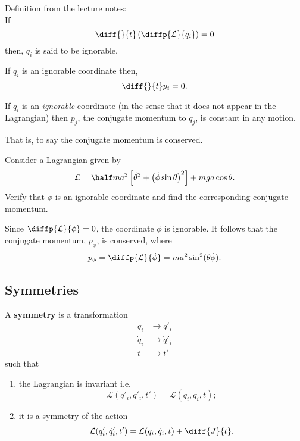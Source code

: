 \documentclass[12pt, a4paper]{article}
\newcommand{\LL}{\mathcal L}
\begin{document}
\begin{mdremark}
    Definition from the lecture notes: \\
    If 
    \[\diff{}{t} \left( \diffp{\LL}{{\dot{q}_i}} \right) =0\]
    then, \(q_i\) is said to be ignorable.
\end{mdremark}

\begin{theorem}
    If \(q_i\) is an ignorable coordinate then,
    \[\diff{}{t} p_i =0.\]
\end{theorem}

\begin{mdcor}
    If \(q_i\) is an \textit{ignorable} coordinate (in the sense that it does not appear in the Lagrangian) then \(p_j\), the conjugate momentum to \(q_j\), is constant in any motion.
\end{mdcor}

\begin{mdremark}
    That is, to say the conjugate momentum is conserved.
\end{mdremark}

\begin{mdexample}
    Consider a Lagrangian given by 
    \[\mathcal{L}=\half ma^2 \left[ \dot{\theta}^2 + \left( \dot{\phi} \sin\theta \right)^2\right] +mga\cos\theta.\]
    Verify that \(\phi\) is an ignorable coordinate and find the corresponding conjugate \\ momentum.
    \begin{solution}
        Since \(\diffp{\mathcal{L}}{\phi}=0\), the coordinate \(\phi\) is ignorable. It follows that the conjugate momentum, \(p_{\phi}\), is conserved, where 
        \[p_{\phi} = \diffp{\mathcal{L}}{{\dot{\phi}}} = ma^2\sin^2(\theta \dot{\phi}).\]
    \end{solution}
\end{mdexample}

\pagebreak

\subsection{Symmetries}

\begin{definition}
    A \textbf{symmetry} is a transformation 
    \[\begin{aligned}
        q_i &\to q'_i \\
        \dot{q}_i &\to \dot{q}'_i \\
        t &\to t'
    \end{aligned}\]
    such that
    \begin{enumerate}
        \item the Lagrangian is invariant i.e. 
        \[\mathcal{L}(q'_i,\dot{q}'_i,t')=\mathcal{L}(q_i,\dot{q}_i,t);\]
        \item it is a symmetry of the action 
        \[\mathcal{L}(q'_i,\dot{q}'_i,t')=\mathcal{L}(q_i,\dot{q}_i,t) + \diff{J}{t}.\]
    \end{enumerate}
\end{definition}
\end{document}
